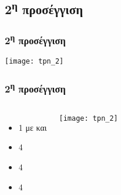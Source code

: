 \subsection{2\textsuperscript{η} προσέγγιση}

\begin{frame}
\frametitle{2\textsuperscript{η} προσέγγιση}
  \centering
  \texttt{[image: tpn\_2]}
\end{frame}

\begin{frame}
\frametitle{2\textsuperscript{η} προσέγγιση}
  \begin{columns}

  \begin{itemize}
  \item 1  με   και 
  \item  4  \\
  \item 4 
  \item 4  
  \end{itemize}

  \centering
  \texttt{[image: tpn\_2]}
  \end{columns}
\end{frame}

% 